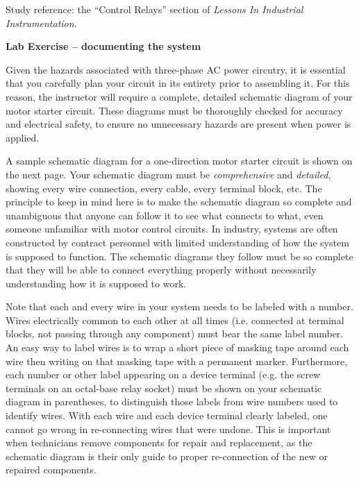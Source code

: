 \vfil

Study reference: the ``Control Relays'' section of {\it Lessons In Industrial Instrumentation}.









\vfil \eject

\noindent
{\bf Lab Exercise -- documenting the system}

\vskip 5pt

Given the hazards associated with three-phase AC power circutry, it is essential that you carefully plan your circuit in its entirety prior to assembling it.  For this reason, the instructor will require a complete, detailed schematic diagram of your motor starter circuit.  These diagrams must be thoroughly checked for accuracy and electrical safety, to ensure no unnecessary hazards are present when power is applied.

\vskip 10pt

A sample schematic diagram for a one-direction motor starter circuit is shown on the next page.  Your schematic diagram must be {\it comprehensive} and {\it detailed}, showing every wire connection, every cable, every terminal block, etc.  The principle to keep in mind here is to make the schematic diagram so complete and unambiguous that anyone can follow it to see what connects to what, even someone unfamiliar with motor control circuits.  In industry, systems are often constructed by contract personnel with limited understanding of how the system is supposed to function.  The schematic diagrams they follow must be so complete that they will be able to connect everything properly without necessarily understanding how it is supposed to work.

Note that each and every wire in your system needs to be labeled with a number.  Wires electrically common to each other at all times (i.e. connected at terminal blocks, not passing through any component) must bear the same label number.  An easy way to label wires is to wrap a short piece of masking tape around each wire then writing on that masking tape with a permanent marker.  Furthermore, each number or other label appearing on a device terminal (e.g. the screw terminals on an octal-base relay socket) must be shown on your schematic diagram in parentheses, to distinguish those labels from wire numbers used to identify wires.  With each wire and each device terminal clearly labeled, one cannot go wrong in re-connecting wires that were undone.  This is important when technicians remove components for repair and replacement, as the schematic diagram is their only guide to proper re-connection of the new or repaired components.

